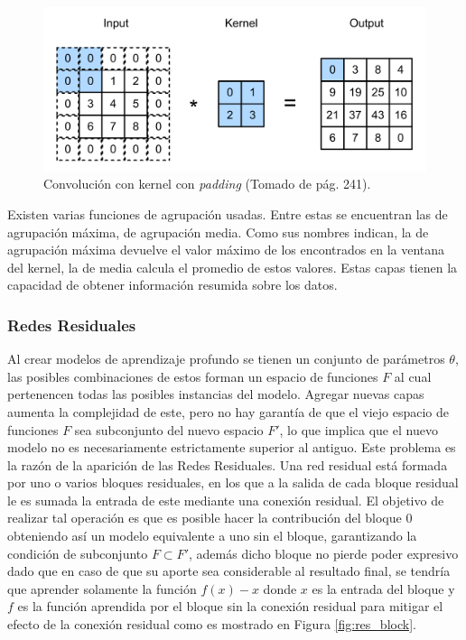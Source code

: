 \begin{figure}[h!]
	\begin{center}
		\begin{center}
			\includegraphics[scale=.3]{Graphics/kernel_convolution_padding.png}
        \end{center}
	    \caption{Convolución con kernel con \emph{padding} (Tomado de \cite{d2l} pág. 241).}\label{fig:conv_kernel_padding}
	\end{center}
\end{figure}

Existen varias funciones de agrupación usadas. Entre estas se encuentran las de agrupación máxima, de 
agrupación media. Como sus nombres indican, la de agrupación máxima devuelve el valor máximo de los encontrados
en la ventana del kernel, la de media calcula el promedio de estos valores. Estas capas tienen la capacidad de obtener
información resumida sobre los datos.

\subsubsection{Redes Residuales}

Al crear modelos de aprendizaje profundo se tienen un conjunto de parámetros $\theta$, las posibles combinaciones 
de estos forman un espacio de funciones $F$ al cual pertenencen todas las posibles instancias del modelo.
Agregar nuevas capas aumenta la complejidad de este, pero no hay garantía de que el viejo espacio 
de funciones $F$ sea subconjunto del nuevo espacio $F'$, lo que implica que el nuevo modelo no es necesariamente
estrictamente superior al antiguo. Este problema es la razón de la aparición de las Redes Residuales. 
Una red residual está formada por 
uno o varios bloques residuales, en los que a la salida de cada bloque residual le es sumada la entrada de 
este mediante una conexión residual.
El objetivo de realizar tal operación es que es posible hacer la contribución del bloque 0 obteniendo así
un modelo equivalente a uno sin el bloque, garantizando la condición de subconjunto $F \subset F'$, además 
dicho bloque no pierde poder expresivo dado que en caso de que su aporte sea considerable al resultado final, 
se tendría que aprender solamente la función $f(x) - x$ donde $x$ es la entrada del bloque y $f$ es la función 
aprendida por el bloque sin la conexión residual para mitigar el efecto de la conexión residual como es mostrado
en Figura \ref{fig:res_block}.

